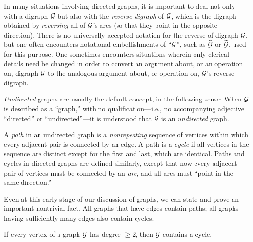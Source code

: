 In many situations involving directed graphs, it is important to deal not only with a digraph $\mbox{$\cal G$}$
but also  with the {\em reverse digraph} of $\mbox{$\cal G$}$, which is the digraph obtained by {\em reversing}
all of $\mbox{$\cal G$}$'s arcs (so that they point in the opposite direction).  There is no universally accepted 
notation for the reverse of digraph $\mbox{$\cal G$}$, but one often encounters notational
embellishments of ``$\mbox{$\cal G$}$'', such as $\widehat{\mbox{$\cal G$}}$ or $\widetilde{\mbox{$\cal G$}}$, used for
this purpose.  One sometimes encounters situations wherein only clerical details need be changed 
in order to convert an argument about, or an operation on, digraph $\mbox{$\cal G$}$  to the analogous argument 
about, or operation on, $\mbox{$\cal G$}$'s reverse digraph. 


\medskip

{\em Undirected} graphs are usually the default concept, in the following sense: When 
$\mbox{$\cal G$}$ is described as a ``graph,'' with no qualification---i.e., no accompanying adjective 
``directed'' or ``undirected''---it is understood that $\mbox{$\cal G$}$ is an {\em undirected} graph.

\medskip

 
 
A {\em path} in an undirected graph is a {\em nonrepeating} sequence of vertices within which
every adjacent pair is connected by an edge.  A path is a {\em cycle} if all vertices in the
sequence are distinct except for the first and last, which are identical.  Paths and cycles
in directed graphs are defined similarly, except that now every adjacent pair of vertices must be
connected by an {\em arc}, and all arcs must ``point in the same direction.''

Even at this early stage of our discussion of graphs, we can state and prove an important
nontrivial fact.  All graphs that have edges contain paths; all graphs having sufficiently many
edges also contain cycles.

\begin{prop}
\label{thm:cycle-in-graph}
If every vertex of a graph $\mbox{$\cal G$}$ has degree $\geq 2$, then $\mbox{$\cal G$}$ contains a cycle.
\end{prop}

